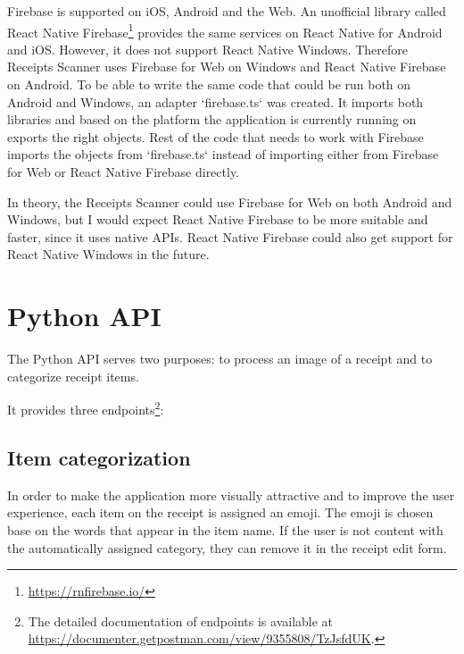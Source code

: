 \documentclass[
  digital, %
  table,   %
  oneside, %
  lof,     %
  lot,     %
]{fithesis3}
\DeclareRobustCommand{\thinskip}{\hskip 0.16667em\relax}
\def\emdash{---}
\def\dosh#1#2{\unskip#1\thinskip#2\thinskip\ignorespaces}
\def\Dash{\dosh\nobreak\emdash}
\begin{document}
\label{phantom:firebase_adapter}
Firebase is supported on iOS, Android and the Web. An unofficial library called React Native Firebase\footnote{\url{https://rnfirebase.io/}} provides the same services on React Native for Android and iOS. However, it does not support React Native Windows. Therefore Receipts Scanner uses Firebase for Web on Windows and React Native Firebase on Android. To be able to write the same code that could be run both on Android and Windows, an adapter `firebase.ts` was created. It imports both libraries and based on the platform the application is currently running on exports the right objects. Rest of the code that needs to work with Firebase imports the objects from `firebase.ts` instead of importing either from Firebase for Web or React Native Firebase directly.

In theory, the Receipts Scanner could use Firebase for Web on both Android and Windows, but I would expect React Native Firebase to be more suitable and faster, since it uses native APIs. React Native Firebase could also get support for React Native Windows in the future.

\section{Python API}
The Python API serves two purposes: to process an image of a receipt and to categorize receipt items.

It provides three endpoints\footnote{The detailed documentation of endpoints is available at \url{https://documenter.getpostman.com/view/9355808/TzJsfdUK}.}:


\subsection{Item categorization}
In order to make the application more visually attractive and to improve the user experience, each item on the receipt is assigned an emoji. The emoji is chosen base on the words that appear in the item name. If the user is not content with the automatically assigned category, they can remove it in the receipt edit form.
\end{document}
